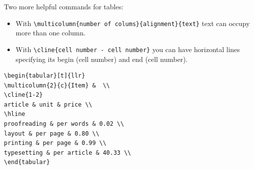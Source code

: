 \begin{frame}[fragile]

Two more helpful commands for tables:

\begin{itemize}
	\item With \lstinline|\multicolumn{number of colums}{alignment}{text}| text can occupy more than one column.
	
	\item With \lstinline|\cline{cell number - cell number}| you can have horizontal lines specifying its begin (cell number) and end (cell number).
\end{itemize}


\begin{multicols}{2}

\begin{lstlisting}
\begin{tabular}[t]{llr}
\multicolumn{2}{c}{Item} &  \\
\cline{1-2}
article & unit & price \\
\hline
proofreading & per words & 0.02 \\
layout & per page & 0.80 \\
printing & per page & 0.99 \\
typesetting & per article & 40.33 \\
\end{tabular}
\end{lstlisting}

%
%
%


\end{multicols}
\end{frame}
